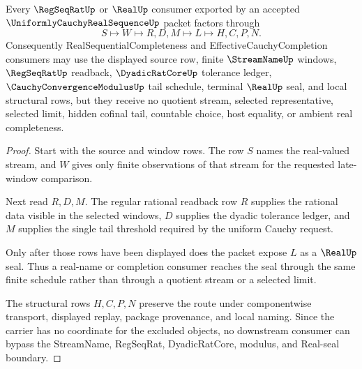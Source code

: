 \begin{theorem}
\label{thm:uniformly-cauchy-real-sequence-regseqrat-route}
Every $\RegSeqRatUp$ or $\RealUp$ consumer exported by an accepted $\UniformlyCauchyRealSequenceUp$ packet factors through
$$
S \longmapsto W \longmapsto R,D,M \longmapsto L \longmapsto H,C,P,N .
$$
Consequently RealSequentialCompleteness and EffectiveCauchyCompletion consumers may use the displayed source row, finite $\StreamNameUp$ windows, $\RegSeqRatUp$ readback, $\DyadicRatCoreUp$ tolerance ledger, $\CauchyConvergenceModulusUp$ tail schedule, terminal $\RealUp$ seal, and local structural rows, but they receive no quotient stream, selected representative, selected limit, hidden cofinal tail, countable choice, host equality, or ambient real completeness.
\end{theorem}
\begin{proof}
Start with the source and window rows. The row $S$ names the real-valued stream, and $W$ gives only finite observations of that stream for the requested late-window comparison.

Next read $R,D,M$. The regular rational readback row $R$ supplies the rational data visible in the selected windows, $D$ supplies the dyadic tolerance ledger, and $M$ supplies the single tail threshold required by the uniform Cauchy request.

Only after those rows have been displayed does the packet expose $L$ as a $\RealUp$ seal. Thus a real-name or completion consumer reaches the seal through the same finite schedule rather than through a quotient stream or a selected limit.

The structural rows $H,C,P,N$ preserve the route under componentwise transport, displayed replay, package provenance, and local naming. Since the carrier has no coordinate for the excluded objects, no downstream consumer can bypass the StreamName, RegSeqRat, DyadicRatCore, modulus, and Real-seal boundary.
\end{proof}


